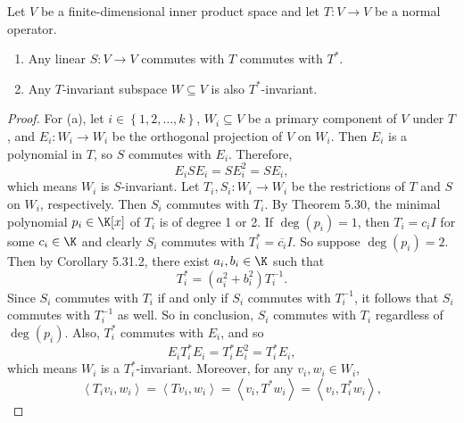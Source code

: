 \documentclass[linearalgebraII]{subfiles}
\begin{document}
    \begin{prop}{}
        Let $V$ be a finite-dimensional inner product space and let $T:V\to V$ be a normal operator. 
        \begin{enumerate}
            \item Any linear $S:V\to V$ commutes with $T$ commutes with $T^{*}$.
            \item Any $T$-invariant subspace $W\subseteq V$ is also $T^{*}$-invariant.
        \end{enumerate}
    \end{prop}

    \begin{proof}
        For (a), let $i\in\left\lbrace 1,2,\ldots,k \right\rbrace$, $W_i\subseteq V$ be a primary component of $V$ under $T$, and $E_i:W_i\to W_i$ be the orthogonal projection of $V$ on $W_i$. Then $E_i$ is a polynomial in $T$, so $S$ commutes with $E_i$. Therefore,
        \begin{equation*}
            E_iSE_i = SE_i^{2} = SE_i,
        \end{equation*}
        which means $W_i$ is $S$-invariant. Let $T_i, S_i:W_i\to W_i$ be the restrictions of $T$ and $S$ on $W_i$, respectively. Then $S_i$ commutes with $T_i$. By Theorem 5.30, the minimal polynomial $p_i\in\K[x]$ of $T_i$ is of degree 1 or 2. If $\deg\left( p_i \right) = 1$, then $T_i=c_iI$ for some $c_i\in\K$ and clearly $S_i$ commutes with $T_i^{*} = \overline{c_i}I$. So suppose $\deg\left( p_i \right) = 2$. Then by Corollary 5.31.2, there exist $a_i,b_i\in\K$ such that
        \begin{equation*}
            T_i^{*} = \left( a_i^{2} + b_i^{2}  \right) T_i^{-1} .
        \end{equation*}
        Since $S_i$ commutes with $T_i$ if and only if $S_i$ commutes with $T_i^{-1}$, it follows that $S_i$ commutes with $T_i^{-1}$ as well. So in conclusion, $S_i$ commutes with $T_i$ regardless of $\deg\left( p_i \right)$. Also, $T_i^{*}$ commutes with $E_i$, and so
        \begin{equation*}
            E_iT_i^{*}E_i = T_i^{*} E_i^2 = T_i^{*} E_i, 
        \end{equation*}
        which means $W_i$ is a $T_i^{*}$-invariant. Moreover, for any $v_i,w_i\in W_i$,
        \begin{equation*}
            \left\langle T_iv_i, w_i\right\rangle = \left\langle Tv_i, w_i\right\rangle = \left\langle v_i, T^{*} w_i\right\rangle = \left\langle v_i, T_i^{*} w_i\right\rangle ,
        \end{equation*}

\end{proof}
\end{document}
